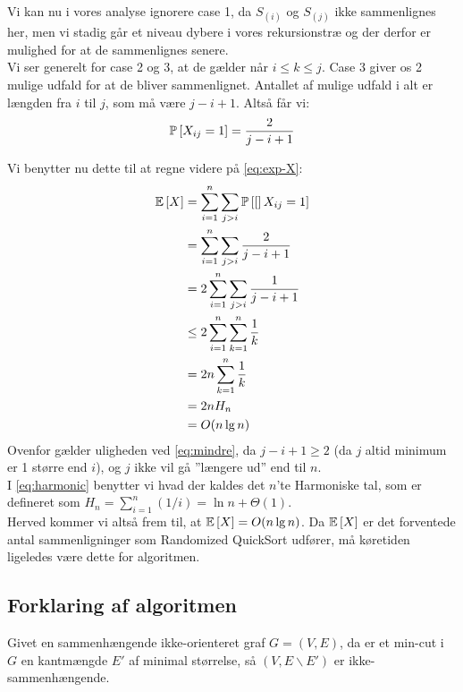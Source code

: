 Vi kan nu i vores analyse ignorere case 1, da $S_{(i)}$ og $S_{(j)}$ ikke sammenlignes her, men vi stadig går et niveau dybere i vores rekursionstræ og der derfor er mulighed for at de sammenlignes senere.\\

Vi ser generelt for case 2 og 3, at de gælder når $i \leq k \leq j$. Case 3 giver os 2 mulige udfald for at de bliver sammenlignet. Antallet af mulige udfald i alt er længden fra $i$ til $j$, som må være $j - i + 1$. Altså får vi:
\begin{align} \label{eq:prob-xij}
  \P{X_{ij} = 1} = \frac{2}{j - i + 1}
\end{align}


Vi benytter nu dette til at regne videre på \cref{eq:exp-X}:
\begin{align}
\E{X} &= \sum_{i=1}^n \sum_{j>i} \P[X_{ij} = 1] \nonumber \\
      &= \sum_{i=1}^n \sum_{j>i} \frac{2}{j - i + 1} \nonumber \\
      &= 2 \sum_{i=1}^n \sum_{j>i} \frac{1}{j - i + 1} \nonumber \\
   &\leq 2 \sum_{i=1}^n \sum_{k=1}^n \frac{1}{k} \label{eq:mindre} \\
      &= 2n \sum_{k=1}^n \frac{1}{k} \nonumber \\
      &= 2n H_n \label{eq:harmonic} \\
      &= O(n \lg n) \nonumber
\end{align}
Ovenfor gælder uligheden ved \cref{eq:mindre}, da $j-i+1 \geq 2$ (da $j$ altid minimum er 1 større end $i$), og $j$ ikke vil gå ''længere ud'' end til $n$.\\
I \cref{eq:harmonic} benytter vi hvad der kaldes det $n$'te Harmoniske tal, som er defineret som $H_n = \sum_{i=1}^n (1/i) = \ln n + \Theta(1)$.\\

Herved kommer vi altså frem til, at $\E{X} = O(n \lg n)$. Da $\E{X}$ er det forventede antal sammenligninger som Randomized QuickSort udfører, må køretiden ligeledes være dette for algoritmen.










\subsection{Forklaring af algoritmen}

Givet en sammenhængende ikke-orienteret graf $G = (V, E)$, da er et min-cut i $G$ en kantmængde $E'$ af minimal størrelse, så $(V, E \backslash E')$ er ikke-sammenhængende.\\

